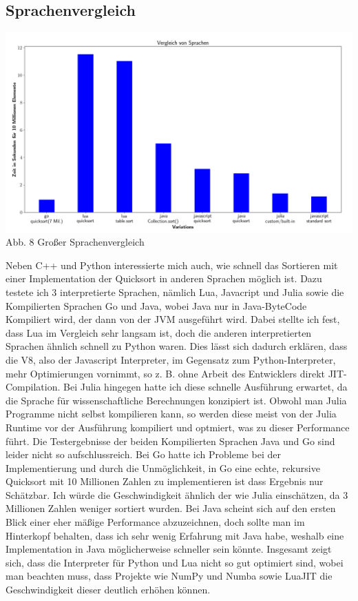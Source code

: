 \documentclass[12pt,a4paper]{article}
\begin{document}
\subsection{Sprachenvergleich}

\begin{center}
    \hspace*{-1.5cm}\includegraphics[width=1.2\textwidth]{./diagramme/matplotlib/comparison.png}
    Abb. 8 Großer Sprachenvergleich
\end{center}

\clearpage

Neben C++ und Python interessierte mich auch, wie schnell das Sortieren mit einer Implementation der Quicksort 
in anderen Sprachen möglich ist. Dazu testete ich 3 interpretierte Sprachen, nämlich Lua, Javacript und Julia sowie die
Kompilierten Sprachen Go und Java, wobei Java nur in Java-ByteCode Kompiliert wird, der dann von der JVM ausgeführt wird.
Dabei stellte ich fest, dass Lua im Vergleich sehr langsam ist, doch die anderen interpretierten Sprachen ähnlich schnell zu Python waren.
Dies lässt sich dadurch erklären, dass die V8, also der Javascript Interpreter, im Gegensatz zum Python-Interpreter,
mehr Optimierungen vornimmt, so z. B. ohne Arbeit des Entwicklers direkt JIT-Compilation. Bei Julia hingegen hatte ich diese
schnelle Ausführung erwartet, da die Sprache für wissenschaftliche Berechnungen konzipiert ist. Obwohl man Julia Programme nicht selbst kompilieren kann,
so werden diese meist von der Julia Runtime vor der Ausführung kompiliert und optmiert, was zu dieser Performance führt.
Die Testergebnisse der beiden Kompilierten Sprachen Java und Go sind leider nicht so aufschlussreich.
Bei Go hatte ich Probleme bei der Implementierung und durch die Unmöglichkeit, in Go eine echte, rekursive Quicksort mit 10 Millionen Zahlen
zu implementieren ist dass Ergebnis nur Schätzbar. Ich würde die Geschwindigkeit ähnlich der wie Julia einschätzen, da 3 Millionen Zahlen weniger sortiert wurden.
Bei Java scheint sich auf den ersten Blick einer eher mäßige Performance abzuzeichnen, doch sollte man im Hinterkopf behalten,
dass ich sehr wenig Erfahrung mit Java habe, weshalb eine Implementation in Java möglicherweise schneller sein könnte.
Insgesamt zeigt sich, dass die Interpreter für Python und Lua nicht so gut optimiert sind, wobei man beachten muss, dass Projekte wie NumPy und Numba sowie LuaJIT
die Geschwindigkeit dieser deutlich erhöhen können.
\end{document}
